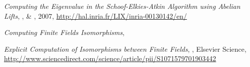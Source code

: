 \documentclass[a4paper]{article} %
\numberwithin{section}{part}
\numberwithin{equation}{section}
\begin{document}
\begin{thebibliography}{LC}
 \emph{Computing the Eigenvalue in the Schoof-Elkies-Atkin
Algorithm using Abelian Lifts}, ,  \&
, 2007, 
\url{http://hal.inria.fr/LIX/inria-00130142/en/}

 \emph{Computing Finite Fields Isomorphisms}, 

 \emph{Explicit Computation of Isomorphisms between Finite
Fields}, , Elsevier Science, 
\url{http://www.sciencedirect.com/science/article/pii/S1071579701903442}

\end{thebibliography}
\end{document}
